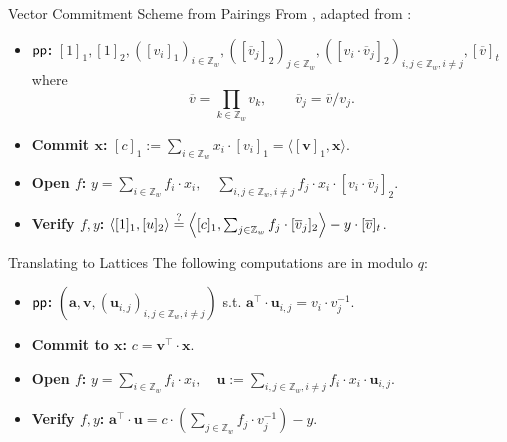 \begin{frame}{Vector Commitment Scheme from Pairings}
	From \cite{AlbrechtCLMT22}, adapted from \cite{CatalanoF13, LibertRY16,LaiM19}:\pause
	\begin{itemize}
		\item \textbf{$\textsf{pp}$:} $[1]_1, [1]_2, ([v_i]_1)_{i\in \mathbb{Z}_w}, ([\overline{v}_j]_2)_{j \in \mathbb{Z}_w}, ([v_i \cdot \overline{v}_j]_2)_{i, j \in \mathbb{Z}_w, i\not=j}, [\overline{v}]_t$ where 
		\begin{equation*}
			\overline{v} = \prod_{k \in \mathbb{Z}_w}v_k,\qquad \overline{v}_j = \overline{v}/v_j.
		\end{equation*}\pause
		\item \textbf{Commit $\mathbf{x}$:} $[c]_1 := \sum_{i \in \mathbb{Z}_w} x_i \cdot [v_i]_1 = \langle[\mathbf{v}]_1, \mathbf{x}\rangle$.\pause
		\item \textbf{Open $f$:} $y = \sum_{i \in \mathbb{Z}_w}f_i\cdot x_i,\quad \sum_{i,j \in \mathbb{Z}_w, i\not=j}f_j\cdot x_i\cdot[v_i\cdot\overline{v}_j]_2$.\pause
		\item \textbf{Verify $f, y$:} $\langle[1]_1, [u]_2\rangle \stackrel{?}{=} \left\langle[c]_1, \sum_{j \in \mathbb{Z}_w}f_j\cdot [\overline{v}_j]_2\right\rangle - y \cdot [\overline{v}]_t$.
	\end{itemize}
\end{frame}
\begin{frame}{Translating to Lattices}
	The following computations are in modulo $q$:\pause
	\begin{itemize}
		\item \textbf{$\textsf{pp}$:} $\left(\mathbf{a}, \mathbf{v}, (\mathbf{u}_{i,j})_{i,j\in \mathbb{Z}_w, i\not=j}\right)$ s.t. $\mathbf{a}^\top\cdot \mathbf{u}_{i,j} = v_i \cdot v_j^{-1}$.\pause
		\item \textbf{Commit to $\mathbf{x}$:} $c = \mathbf{v}^\top\cdot\mathbf{x}$.\pause
		\item \textbf{Open $f$:} $y = \sum_{i \in \mathbb{Z}_w}f_i\cdot x_i,\quad \mathbf{u}:=\sum_{i,j \in \mathbb{Z}_w, i\not=j}f_i\cdot x_i\cdot \mathbf{u}_{i,j}$.\pause
		\item \textbf{Verify $f, y$:} $\mathbf{a}^\top\cdot\mathbf{u} = c\cdot \left(\sum_{j \in \mathbb{Z}_w}f_j\cdot v_j^{-1}\right) -y.$
	\end{itemize}
\end{frame}